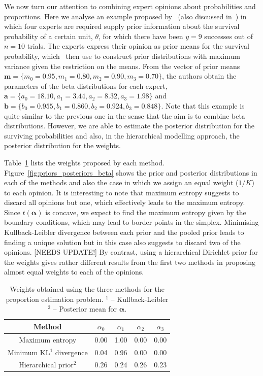 \documentclass[a4paper, notitlepage, 10pt]{article}
\begin{document}
We now turn our attention to combining expert opinions about probabilities and proportions.
Here we analyse an example proposed by~\cite{savchuk1994} (also discussed in~\cite{rufo2012B}) in which four experts are required supply prior information about the survival probability of a certain unit, $\theta$, for which there have been $y = 9$ successes out of $n = 10$ trials.
The experts express their opinion as prior means for the survival probability, which~\cite{savchuk1994} then use to construct prior distributions with maximum variance given the restriction on the means.
From the vector of prior means $\mathbf{m} = \{ m_0 = 0.95, m_1 = 0.80, m_2 = 0.90, m_3 = 0.70 \}$, the authors obtain the parameters of the beta distributions for each expert,  $\mathbf{a} = \{ a_0 = 18.10, a_1 = 3.44 , a_2 = 8.32, a_3 = 1.98 \}$ and  $\mathbf{b} = \{ b_0 = 0.955 , b_1 = 0.860, b_2 = 0.924, b_3 = 0.848\}$.
Note that this example is quite similar to the previous one in the sense that the aim is to combine beta distributions. 
However, we are able to estimate the posterior distribution for the surviving probabilities and also, in the hierarchical modelling approach, the posterior distribution for the weights.

Table~\ref{tab:alphasBeta} lists the weights proposed by each method.
Figure~\ref{fig:priors_posteriors_beta} shows the prior and posterior distributions in each of the methods and also the case in which we assign an equal weight ($1/K$) to each opinion.
It is interesting to note that maximum entropy suggests to discard all opinions but one, which effectively leads to the maximum entropy.
Since $t(\boldsymbol\alpha)$ is concave, we expect to find the maximum entropy given by the boundary conditions, which may lead to border points in the simplex.
Minimising Kullback-Leibler divergence between each prior and the pooled prior leads to finding a unique solution but in this case also suggests to discard two of the opinions. [NEEDS UPDATE!]
By contrast, using a hierarchical Dirichlet prior for the weights gives rather different results from the first two methods in proposing almost equal weights to each of the opinions.

\begin{table}[ht]
\caption{Weights obtained using the three methods for the proportion estimation problem. $^1$ -- Kullback-Leibler $^2$ -- Posterior mean for $\boldsymbol\alpha$.}
\centering
\begin{tabular}{ccccc}
  \hline
Method  & $\alpha_0$ & $\alpha_1$ & $\alpha_2$ & $\alpha_3$ \\ 
  \hline
Maximum entropy & 0.00 & 1.00 & 0.00 & 0.00 \\ 
Minimum KL$^1$ divergence& 0.04 & 0.96 & 0.00 & 0.00 \\ 
Hierarchical prior$^2$ & 0.26 & 0.24 & 0.26 & 0.23 \\ 
   \hline
\end{tabular}
\label{tab:alphasBeta}
\end{table}
\end{document}
